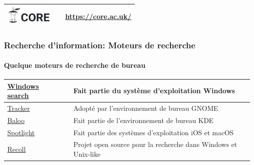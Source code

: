 \documentclass{beamer}
\begin{document}
\begin{frame}
\begin{tabular}{L{.3\textwidth}{1cm}cp{.6\textwidth}}
	\includegraphics[height=1cm]{..//img/Bweb02-ri-gmail/core-logo.png} & 
	& 
	\url{https://core.ac.uk/} \\
	
	\hline
	
\end{tabular}


\end{frame}


\begin{frame}
\frametitle{Recherche d'information: Moteurs de recherche}
\framesubtitle{Quelque moteurs de recherche de bureau}

\begin{tabular}{p{}cp{}}
	
	\hline
	
	\href{https://docs.microsoft.com/en-us/windows/win32/search/-search-3x-wds-overview}{Windows search} &
	& 
	Fait partie du système d'exploitation Windows  \\
	
	\hline
	
	\href{https://gitlab.gnome.org/GNOME/tracker}{Tracker} &
	& 
	Adopté par l'environnement de bureau GNOME \\
	
	\hline
	
	\href{https://community.kde.org/Baloo}{Baloo} & 
	& 
	Fait partie de l'environnement de bureau KDE \\
	
	\hline
	
	\href{https://support.apple.com/en-us/HT204014}{Spotlight} & 
	& 
	Fait partie des systèmes d'exploitation iOS et macOS \\
	
	\hline
	
	\href{https://www.lesbonscomptes.com/recoll/}{Recoll} & 
	& 
	Projet open source pour la recherche dans Windows et Unix-like \\
	
	\hline
	
\end{tabular}


\end{frame}
\end{document}
